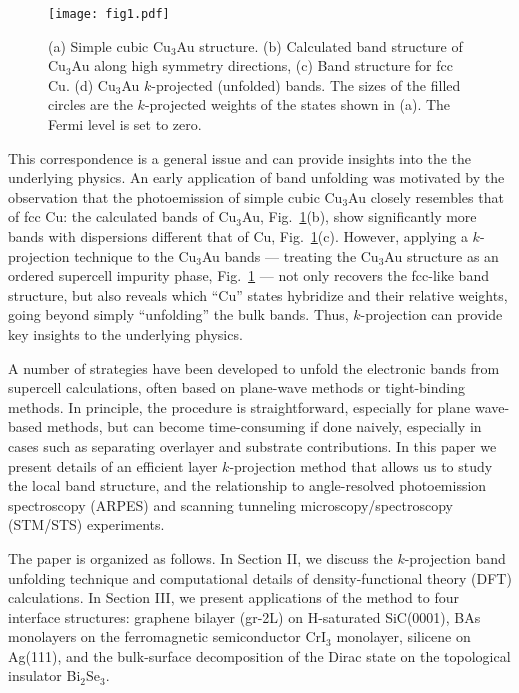 \documentclass[aps,prb,showpacs,twocolumn,reprint,superscriptaddress]{revtex4-1}
\begin{document}
\begin{figure}
  \texttt{[image: fig1.pdf]}
  \caption{
  (a) Simple cubic Cu$_3$Au structure.
  (b) Calculated band structure of Cu$_3$Au along high symmetry directions, 
  (c) Band structure for fcc Cu.
  (d) Cu$_3$Au $k$-projected (unfolded) bands. The sizes of the filled circles are the
$k$-projected weights of the states shown in (a).
The Fermi level is set to zero.
  }
 \label{fig1}
\end{figure}

This correspondence is a general issue and can provide insights into the the underlying physics. An early
application\cite{Weinert1988} of band unfolding was motivated by the observation that
the photoemission of simple cubic
Cu$_3$Au closely resembles that of fcc Cu: the calculated bands of Cu$_3$Au,
Fig.~\ref{fig1}(b), show significantly more bands with dispersions different that of
Cu, Fig.~\ref{fig1}(c). However, applying a $k$-projection technique to the Cu$_3$Au bands --- treating
the Cu$_3$Au structure as an ordered supercell impurity phase, Fig.~\ref{fig1} --- not only
recovers the fcc-like band structure, but also reveals which ``Cu'' states hybridize and their relative
weights, going beyond simply ``unfolding'' the bulk bands. Thus, $k$-projection 
can provide key insights to the underlying physics.


A number of strategies have been developed to unfold the electronic bands from supercell calculations,
often based on plane-wave methods or tight-binding
methods.\cite{Weinert1988,Qi2010Epitaxial,Boykin2005,Ku2010,Lee2013,huang2014,Roser2014,APL_step}
In principle, the procedure is straightforward, especially for plane wave-based methods, but can become
time-consuming if done naively, especially in cases such as separating overlayer and substrate contributions.
In this paper we present details of an efficient layer $k$-projection method that
allows us to study the local band structure,\cite{Qi2010Epitaxial,Chen2014} and the relationship to 
angle-resolved photoemission spectroscopy (ARPES)\cite{FeSe_STO,LiOHFeSe}
and scanning tunneling microscopy/spectroscopy (STM/STS)\cite{Zhang2018} experiments.

The paper is organized as follows.  In Section II, we discuss the $k$-projection band unfolding technique and
computational details of density-functional theory (DFT) calculations.  In Section III, we present
applications of the method to four interface structures: graphene bilayer (gr-2L) on H-saturated SiC(0001),
BAs monolayers on the ferromagnetic semiconductor CrI$_3$ monolayer, silicene on Ag(111), and the
bulk-surface decomposition of the Dirac state on the topological insulator Bi$_2$Se$_3$. 
\end{document}
